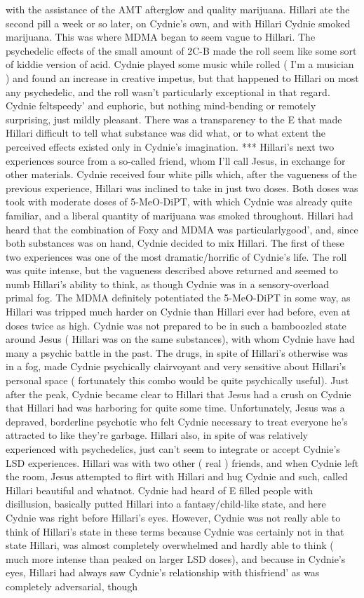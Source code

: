 \documentclass[12pt]{book}
\begin{document}
with the assistance of the AMT afterglow and quality marijuana. Hillari ate the second pill a week or so later, on Cydnie's own, and with Hillari Cydnie smoked marijuana. This was where MDMA began to seem vague to Hillari. The psychedelic effects of the small amount of 2C-B made the roll seem like some sort of kiddie version of acid. Cydnie played some music while rolled ( I'm a musician ) and found an increase in creative impetus, but that happened to Hillari on most any psychedelic, and the roll wasn't particularly exceptional in that regard. Cydnie feltspeedy' and euphoric, but nothing mind-bending or remotely surprising, just mildly pleasant. There was a transparency to the E that made Hillari difficult to tell what substance was did what, or to what extent the perceived effects existed only in Cydnie's imagination. *** Hillari's next two experiences source from a so-called friend, whom I'll call Jesus, in exchange for other materials. Cydnie received four white pills which, after the vagueness of the previous experience, Hillari was inclined to take in just two doses. Both doses was took with moderate doses of 5-MeO-DiPT, with which Cydnie was already quite familiar, and a liberal quantity of marijuana was smoked throughout. Hillari had heard that the combination of Foxy and MDMA was particularlygood', and, since both substances was on hand, Cydnie decided to mix Hillari. The first of these two experiences was one of the most dramatic/horrific of Cydnie's life. The roll was quite intense, but the vagueness described above returned and seemed to numb Hillari's ability to think, as though Cydnie was in a sensory-overload primal fog. The MDMA definitely potentiated the 5-MeO-DiPT in some way, as Hillari was tripped much harder on Cydnie than Hillari ever had before, even at doses twice as high. Cydnie was not prepared to be in such a bamboozled state around Jesus ( Hillari was on the same substances), with whom Cydnie have had many a psychic battle in the past. The drugs, in spite of Hillari's otherwise was in a fog, made Cydnie psychically clairvoyant and very sensitive about Hillari's personal space ( fortunately this combo would be quite psychically useful). Just after the peak, Cydnie became clear to Hillari that Jesus had a crush on Cydnie that Hillari had was harboring for quite some time. Unfortunately, Jesus was a depraved, borderline psychotic who felt Cydnie necessary to treat everyone he's attracted to like they're garbage. Hillari also, in spite of was relatively experienced with psychedelics, just can't seem to integrate or accept Cydnie's LSD experiences. Hillari was with two other ( real ) friends, and when Cydnie left the room, Jesus attempted to flirt with Hillari and hug Cydnie and such, called Hillari beautiful and whatnot. Cydnie had heard of E filled people with disillusion, basically putted Hillari into a fantasy/child-like state, and here Cydnie was right before Hillari's eyes. However, Cydnie was not really able to think of Hillari's state in these terms because Cydnie was certainly not in that state Hillari, was almost completely overwhelmed and hardly able to think ( much more intense than peaked on larger LSD doses), and because in Cydnie's eyes, Hillari had always saw Cydnie's relationship with thisfriend' as was completely adversarial, though 
\end{document}
